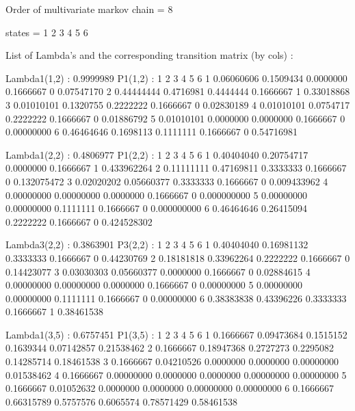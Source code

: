 \documentclass[
  nojss]{jss}
\begin{document}
\begin{CodeChunk}

\begin{CodeOutput}
Order of multivariate markov chain = 8 
\end{CodeOutput}

\begin{CodeOutput}
states = 1 2 3 4 5 6 
\end{CodeOutput}


\begin{CodeOutput}
List of Lambda's and the corresponding transition matrix (by cols) :
\end{CodeOutput}

\begin{CodeOutput}
Lambda1(1,2) : 0.9999989
P1(1,2) : 
           1         2         3         4 5          6
1 0.06060606 0.1509434 0.0000000 0.1666667 0 0.07547170
2 0.44444444 0.4716981 0.4444444 0.1666667 1 0.33018868
3 0.01010101 0.1320755 0.2222222 0.1666667 0 0.02830189
4 0.01010101 0.0754717 0.2222222 0.1666667 0 0.01886792
5 0.01010101 0.0000000 0.0000000 0.1666667 0 0.00000000
6 0.46464646 0.1698113 0.1111111 0.1666667 0 0.54716981

Lambda1(2,2) : 0.4806977
P1(2,2) : 
           1          2         3         4 5           6
1 0.40404040 0.20754717 0.0000000 0.1666667 1 0.433962264
2 0.11111111 0.47169811 0.3333333 0.1666667 0 0.132075472
3 0.02020202 0.05660377 0.3333333 0.1666667 0 0.009433962
4 0.00000000 0.00000000 0.0000000 0.1666667 0 0.000000000
5 0.00000000 0.00000000 0.1111111 0.1666667 0 0.000000000
6 0.46464646 0.26415094 0.2222222 0.1666667 0 0.424528302

Lambda3(2,2) : 0.3863901
P3(2,2) : 
           1          2         3         4 5          6
1 0.40404040 0.16981132 0.3333333 0.1666667 0 0.44230769
2 0.18181818 0.33962264 0.2222222 0.1666667 0 0.14423077
3 0.03030303 0.05660377 0.0000000 0.1666667 0 0.02884615
4 0.00000000 0.00000000 0.0000000 0.1666667 0 0.00000000
5 0.00000000 0.00000000 0.1111111 0.1666667 0 0.00000000
6 0.38383838 0.43396226 0.3333333 0.1666667 1 0.38461538

Lambda1(3,5) : 0.6757451
P1(3,5) : 
          1          2         3         4          5          6
1 0.1666667 0.09473684 0.1515152 0.1639344 0.07142857 0.21538462
2 0.1666667 0.18947368 0.2727273 0.2295082 0.14285714 0.18461538
3 0.1666667 0.04210526 0.0000000 0.0000000 0.00000000 0.01538462
4 0.1666667 0.00000000 0.0000000 0.0000000 0.00000000 0.00000000
5 0.1666667 0.01052632 0.0000000 0.0000000 0.00000000 0.00000000
6 0.1666667 0.66315789 0.5757576 0.6065574 0.78571429 0.58461538


\end{CodeOutput}
\end{CodeChunk}
\end{document}
